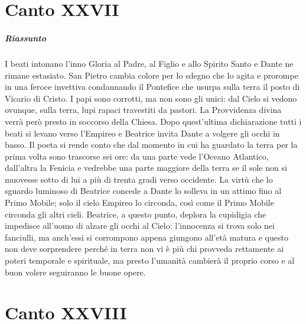 \documentclass[a4paper, twoside, titlepage]{book}
\begin{document}
\chapter{Canto XXVII}

\paragraph{Riassunto} I beati intonano l’inno Gloria al Padre, al Figlio e allo Spirito Santo e Dante ne rimane estasiato. San Pietro cambia colore per lo sdegno che lo agita e prorompe in una feroce invettiva condannando il Pontefice che usurpa sulla terra il posto di Vicario di Cristo. I papi sono corrotti, ma non sono gli unici: dal Cielo si vedono ovunque, sulla terra, lupi rapaci travestiti da pastori. La Provvidenza divina verrà però presto in soccorso della Chiesa. Dopo quest’ultima dichiarazione tutti i beati si levano verso l’Empireo e Beatrice invita Dante a volgere gli occhi in basso. Il poeta si rende conto che dal momento in cui ha guardato la terra per la prima volta sono trascorse sei ore: da una parte vede l’Oceano Atlantico, dall’altra la Fenicia e vedrebbe una parte maggiore della terra se il sole non si muovesse sotto di lui a più di trenta gradi verso occidente. La virtù che lo sguardo luminoso di Beatrice concede a Dante lo solleva in un attimo fino al Primo Mobile; solo il cielo Empireo lo circonda, così come il Primo Mobile circonda gli altri cieli. Beatrice, a questo punto, deplora la cupidigia che impedisce all’uomo di alzare gli occhi al Cielo: l’innocenza si trova solo nei fanciulli, ma anch’essi si corrompono appena giungono all’età matura e questo non deve sorprendere perché in terra non vi è più chi provveda rettamente ai poteri temporale e spirituale, ma presto l’umanità cambierà il proprio corso e al buon volere seguiranno le buone opere.

\chapter{Canto XXVIII}
\end{document}
